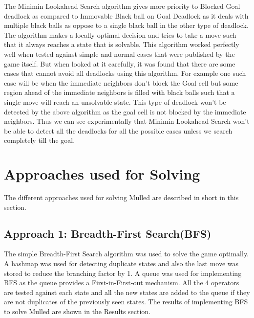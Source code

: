 \documentclass[letterpaper]{article}
\begin{document}
The Minimin Lookahead Search algorithm gives more priority to Blocked Goal deadlock as compared to Immovable Black ball on Goal Deadlock as it deals with multiple black balls as oppose to a single black ball in the other type of deadlock. The algorithm makes a locally optimal decision and tries to take a move such that it always reaches a state that is solvable. This algorithm worked perfectly well when tested against simple and normal cases that were published by the game itself. But when looked at it carefully, it was found that there are some cases that cannot avoid all deadlocks using this algorithm. For example one such case will be when the immediate neighbors don't block the Goal cell but some region ahead of the immediate neighbors is filled with black balls such that a single move will reach an unsolvable state. This type of deadlock won't be detected by the above algorithm as the goal cell is not blocked by the immediate neighbors. Thus we can see experimentally that Minimin Lookahead Search won't be able to detect all the deadlocks for all the possible cases unless we search completely till the goal.

\section{Approaches used for Solving}
The different approaches used for solving Mulled are described in short in this section.

\subsection{Approach 1: Breadth-First Search(BFS)}
The simple Breadth-First Search algorithm was used to solve the game optimally. A hashmap was used for detecting duplicate states and also the last move was stored to reduce the branching factor by 1. A queue was used for implementing BFS as the queue provides a First-in-First-out mechanism. All the 4 operators are tested against each state and all the new states are added to the queue if they are not duplicates of the previously seen states. The results of implementing BFS to solve Mulled are shown in the Results section.
\end{document}
